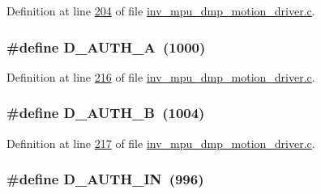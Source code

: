 Definition at line \hyperlink{inv__mpu__dmp__motion__driver_8c_source_l00204}{204} of file \hyperlink{inv__mpu__dmp__motion__driver_8c_source}{inv\+\_\+mpu\+\_\+dmp\+\_\+motion\+\_\+driver.\+c}.

\subsubsection[{\texorpdfstring{D\+\_\+\+A\+U\+T\+H\+\_\+A}{D_AUTH_A}}]{\setlength{\rightskip}{0pt plus 5cm}\#define D\+\_\+\+A\+U\+T\+H\+\_\+A~(1000)}\hypertarget{group___d_r_i_v_e_r_s_gaf2eaee2b8c50adbd556a815d7ab795e9}{}\label{group___d_r_i_v_e_r_s_gaf2eaee2b8c50adbd556a815d7ab795e9}


Definition at line \hyperlink{inv__mpu__dmp__motion__driver_8c_source_l00216}{216} of file \hyperlink{inv__mpu__dmp__motion__driver_8c_source}{inv\+\_\+mpu\+\_\+dmp\+\_\+motion\+\_\+driver.\+c}.

\subsubsection[{\texorpdfstring{D\+\_\+\+A\+U\+T\+H\+\_\+B}{D_AUTH_B}}]{\setlength{\rightskip}{0pt plus 5cm}\#define D\+\_\+\+A\+U\+T\+H\+\_\+B~(1004)}\hypertarget{group___d_r_i_v_e_r_s_ga7ee552ff37e87403b24788c2b8e80ce6}{}\label{group___d_r_i_v_e_r_s_ga7ee552ff37e87403b24788c2b8e80ce6}


Definition at line \hyperlink{inv__mpu__dmp__motion__driver_8c_source_l00217}{217} of file \hyperlink{inv__mpu__dmp__motion__driver_8c_source}{inv\+\_\+mpu\+\_\+dmp\+\_\+motion\+\_\+driver.\+c}.

\subsubsection[{\texorpdfstring{D\+\_\+\+A\+U\+T\+H\+\_\+\+IN}{D_AUTH_IN}}]{\setlength{\rightskip}{0pt plus 5cm}\#define D\+\_\+\+A\+U\+T\+H\+\_\+\+IN~(996)}\hypertarget{group___d_r_i_v_e_r_s_gad59a17a973be28ebc0d0bc3ae1e3316f}{}\label{group___d_r_i_v_e_r_s_gad59a17a973be28ebc0d0bc3ae1e3316f}


